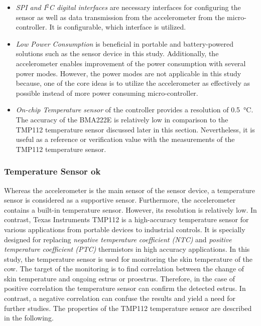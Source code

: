 \documentclass[english,12pt,a4paper,pdftex,elec,utf8]{aaltothesis}
\begin{document}
\begin{itemize}
\item \textit{SPI and I$^2$C digital interfaces} are necessary interfaces for configuring the sensor as well as data transmission from the accelerometer from the micro-controller. It is configurable, which interface is utilized.

\item \textit{Low Power Consumption} is beneficial in portable and battery-powered solutions such as the sensor device in this study. Additionally, the accelerometer enables improvement of the power consumption with several power modes. However, the power modes are not applicable in this study because, one of the core ideas is to utilize the accelerometer as effectively as possible instead of more  power consuming micro-controller.
 
\item \textit{On-chip Temperature sensor} of the controller provides a resolution of \SI{0.5}{\celsius}. The accuracy of the BMA222E is relatively low in comparison to the TMP112 temperature sensor discussed later in this section. Nevertheless, it is useful as a reference or verification value with the measurements of the TMP112 temperature sensor. \cite{bma222datasheet}

\end{itemize}


\subsubsection*{Temperature Sensor ok}

Whereas the accelerometer is the main sensor of the sensor device, a temperature sensor is considered as a supportive sensor. Furthermore, the accelerometer contains a built-in temperature sensor. However, its resolution is relatively low. In contrast, Texas Instruments TMP112 is a high-accuracy temperature sensor for various applications from portable devices to industrial controls.  It is specially designed for replacing \textit{negative temperature coefficient (NTC)} and \textit{positive temperature coefficient (PTC)} thermistors in high accuracy applications. In this study, the temperature sensor is used for monitoring the skin temperature of the cow. The target of the monitoring is to find correlation between the change of skin temperature and ongoing estrus or proestrus. Therefore, in the case of positive correlation the temperature sensor can confirm the detected estrus. In contrast, a negative correlation can confuse the results and yield a need for further studies. The properties of the TMP112 temperature sensor are described in the following.
\end{document}
